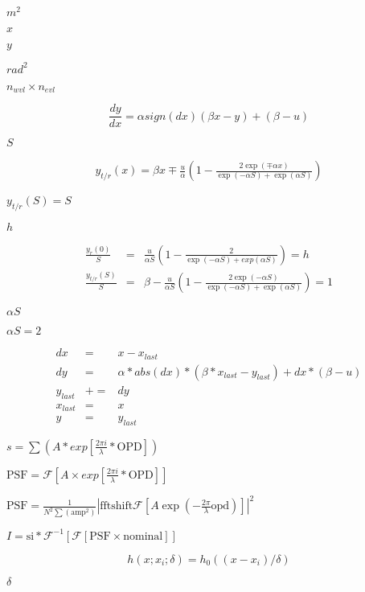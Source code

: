\documentclass{article}
\begin{document}
$m^2$
\pagebreak

$x$
\pagebreak

$y$
\pagebreak

$rad^2$
\pagebreak

$n_{wvl}\times n_{evl}$
\pagebreak

\[ \frac{dy}{dx}=\alpha sign(dx) (\beta x-y)+(\beta-u) \]
\pagebreak

$S$
\pagebreak

\begin{eqnarray*} y_{t/r}(x)=\beta x \mp \frac{u}{\alpha}\left(1-\frac{2\exp(\mp\alpha x)}{\exp(-\alpha S)+\exp(\alpha S)}\right) \end{eqnarray*}
\pagebreak

$y_{t/r}(S)=S$
\pagebreak

$h$
\pagebreak

\begin{eqnarray*} \frac{y_r(0)}{S}&=&\frac{u}{\alpha S}\left(1-\frac{2}{\exp(-\alpha S)+exp(\alpha S)}\right)=h \\ \frac{y_{t/r}(S)}{S}&=&\beta-\frac{u}{\alpha S}\left(1-\frac{2\exp(-\alpha S)}{\exp(-\alpha S)+\exp(\alpha S)}\right) = 1 \end{eqnarray*}
\pagebreak

$\alpha S$
\pagebreak

$\alpha S=2$
\pagebreak

\begin{eqnarray*} dx &=& x-x_{last} \\ dy &=& \alpha*abs(dx)*(\beta*x_{last}-y_{last})+dx*(\beta-u) \\ y_{last}&\mathrel{+}=&dy \\ x_{last}&=&x \\ y&=&y_{last} \end{eqnarray*}
\pagebreak

$s=\sum(A*exp[\frac{2\pi i}{\lambda}*\textrm{OPD}]) $
\pagebreak

$\textrm{PSF}=\mathcal{F}[A\times exp[\frac{2\pi i}{\lambda}*\textrm{OPD}]]$
\pagebreak

$\textrm{PSF}=\frac{1}{N^2\sum(\textrm{amp}^2)}|\textrm{fftshift}\mathcal{F}[A \exp(-\frac{2\pi}{\lambda}\textrm{opd})]|^2$
\pagebreak

$I=\textrm{si}*\mathcal{F}^{-1}[\mathcal{F}[\textrm{PSF}\times\textrm{nominal}]]$
\pagebreak

\[ h(x;x_{i};\delta)=h_{0}((x-x_{i})/\delta) \]
\pagebreak

$\delta$
\pagebreak
\end{document}
